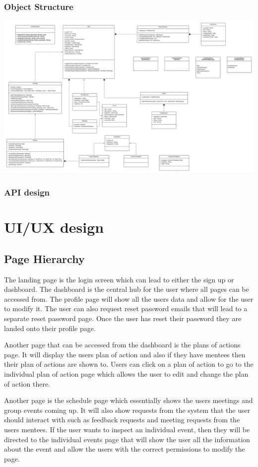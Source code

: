 \documentclass[10pt]{article}
\begin{document}
\subsubsection{Object Structure}
\includegraphics{Objects}

\subsubsection{API design}

\section{UI/UX design}

\subsection{Page Hierarchy}
The landing page is the login screen which can lead to either the sign up or
dashboard. The dashboard is the central hub for the user where all pages can be
accessed from. The profile page will show all the users data and allow for the
user to modify it. The user can also request reset password emails that will
lead to a separate reset password page. Once the user has reset their password
they are landed onto their profile page.

Another page that can be accessed from the dashboard is the plans of actions
page. It will display the users plan of action and also if they have mentees
then their plan of actions are shown to. Users can click on a plan of action to
go to the individual plan of action page which allows the user to edit and
change the plan of action there.

Another page is the schedule page which essentially shows the users meetings and
group events coming up. It will also show requests from the system that the user
should interact with such as feedback requests and meeting requests from the
users mentees. If the user wants to inspect an individual event, then they will
be directed to the individual events page that will show the user all the
information about the event and allow the users with the correct permissions to
modify the page.
\end{document}
